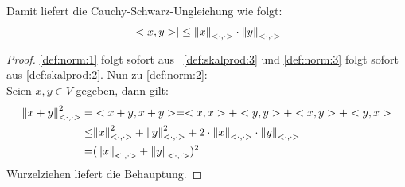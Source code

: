 \begin{Bemerkung}{
	Damit liefert die Cauchy-Schwarz-Ungleichung wie folgt:
	\begin{align*}
		\abs{<x,y>} \leq \norm{x}_{<\cdot, \cdot>} \cdot \norm{y}_{<\cdot, \cdot>}
	\end{align*}
}\end{Bemerkung}

\begin{proof}
	\ref{def:norm:1} folgt sofort aus ~\ref{def:skalprod:3} und \ref{def:norm:3} folgt sofort aus 
	\ref{def:skalprod:2}. Nun zu \ref{def:norm:2}: \\
	Seien $x,y \in V$ gegeben, dann gilt:
	\begin{align*}
		\norm{x + y}^2_{<\cdot,\cdot>} = & <x+y, x+y> =
		<x,x> + <y,y> + <x,y> + <y,x> \\
		\leq & \norm{x}^2_{<\cdot,\cdot>} + \norm{y}^2_{<\cdot,\cdot>} 
		+ 2 \cdot \norm{x}_{<\cdot,\cdot>} \cdot \norm{y}_{<\cdot,\cdot>}\\
		=& (\norm{x}_{<\cdot,\cdot>} + \norm{y}_{<\cdot,\cdot>})^2
	\end{align*}
	Wurzelziehen liefert die Behauptung.
\end{proof}

